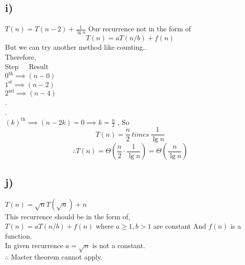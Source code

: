 \documentclass[a4paper, 11pt]{article}
\begin{document}
\subsection*{i)}
$T(n) = T(n-2) + \frac{1}{\lg n}$
Our recurrence not in the form of
$$T(n) = aT(n/b) +f(n) $$
But we can try another method like counting..\\
Therefore,\\
Step \,\,\,\,\,  Result\\
$0^{\text{th}} \implies (n-0)$\\
$1^{\text{st}} \implies (n-2)$\\
$2^{\text{nd}} \implies (n-4)$\\
.\\
.\\  
$(k)^{\text{th}} \implies (n-2k) = 0 \implies k=\frac{n}{2}$ , So
$$T(n) = \frac{n}{2} \, times \, \frac{1}{\lg n}$$
$$\therefore T(n)= \Theta (\frac{n}{2} \cdot \frac{1}{\lg n}) = \Theta (\frac{n}{\lg n})$$

\subsection*{j)}
$T(n) = \sqrt{n} T(\sqrt{n}) + n$\\
This recurrence should be in the form of,\\
$T(n) = aT(n/b) + f(n)$ where $a \ge 1 , b > 1 $ are constant And $f(n)$ is a function. \\
In given recurrence $a=\sqrt{n}$ is not a constant.\\
$\therefore $ Master theorem cannot apply.
\end{document}
